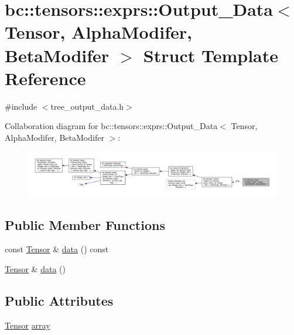 \hypertarget{structbc_1_1tensors_1_1exprs_1_1Output__Data}{}\section{bc\+:\+:tensors\+:\+:exprs\+:\+:Output\+\_\+\+Data$<$ Tensor, Alpha\+Modifer, Beta\+Modifer $>$ Struct Template Reference}
\label{structbc_1_1tensors_1_1exprs_1_1Output__Data}


{\ttfamily \#include $<$tree\+\_\+output\+\_\+data.\+h$>$}



Collaboration diagram for bc\+:\+:tensors\+:\+:exprs\+:\+:Output\+\_\+\+Data$<$ Tensor, Alpha\+Modifer, Beta\+Modifer $>$\+:\nopagebreak
\begin{figure}[H]
\begin{center}
\leavevmode
\includegraphics[width=350pt]{structbc_1_1tensors_1_1exprs_1_1Output__Data__coll__graph}
\end{center}
\end{figure}
\subsection*{Public Member Functions}
\begin{DoxyCompactItemize}
\item 
const \hyperlink{namespacebc_a659391e47ab612be3ba6c18cf9c89159}{Tensor} \& \hyperlink{structbc_1_1tensors_1_1exprs_1_1Output__Data_a78e4c65ec0092212f48fefa843f3e9bf}{data} () const
\item 
\hyperlink{namespacebc_a659391e47ab612be3ba6c18cf9c89159}{Tensor} \& \hyperlink{structbc_1_1tensors_1_1exprs_1_1Output__Data_a45a7ad6d58afcf0219836c49123f9fbf}{data} ()
\end{DoxyCompactItemize}
\subsection*{Public Attributes}
\begin{DoxyCompactItemize}
\item 
\hyperlink{namespacebc_a659391e47ab612be3ba6c18cf9c89159}{Tensor} \hyperlink{structbc_1_1tensors_1_1exprs_1_1Output__Data_ab5d07d4d17f739b0dc4b63ab87921bb7}{array}
\end{DoxyCompactItemize}
